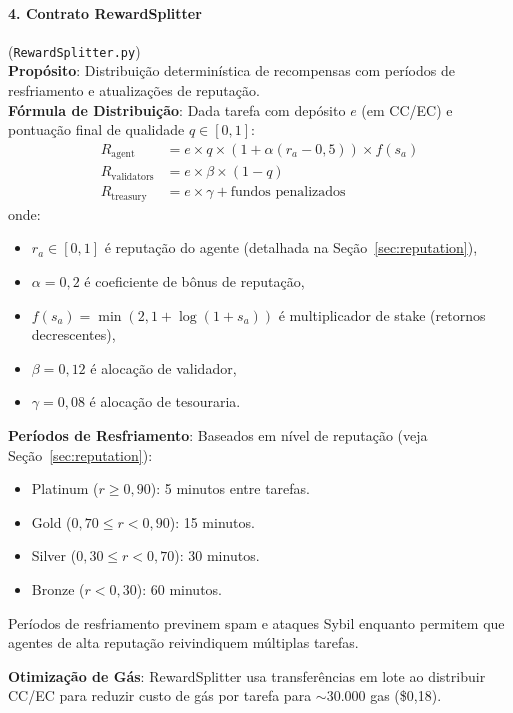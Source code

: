\documentclass[11pt]{article}
\begin{document}
\paragraph{4. Contrato RewardSplitter} (\texttt{RewardSplitter.py})\\
\textbf{Propósito}: Distribuição determinística de recompensas com períodos de resfriamento e atualizações de reputação.\\
\textbf{Fórmula de Distribuição}: Dada tarefa com depósito $e$ (em CC/EC) e pontuação final de qualidade $q \in [0,1]$:
\begin{align}
R_{\text{agent}} &= e \times q \times \left(1 + \alpha (r_a - 0,5)\right) \times f(s_a) \label{eq:reward-agent} \\
R_{\text{validators}} &= e \times \beta \times (1-q) \label{eq:reward-validators} \\
R_{\text{treasury}} &= e \times \gamma + \text{fundos penalizados} \label{eq:reward-treasury}
\end{align}
onde:
\begin{itemize}[noitemsep]
  \item $r_a \in [0,1]$ é reputação do agente (detalhada na Seção~\ref{sec:reputation}),
  \item $\alpha = 0,2$ é coeficiente de bônus de reputação,
  \item $f(s_a) = \min(2, 1 + \log(1+s_a))$ é multiplicador de stake (retornos decrescentes),
  \item $\beta = 0,12$ é alocação de validador,
  \item $\gamma = 0,08$ é alocação de tesouraria.
\end{itemize}
\textbf{Períodos de Resfriamento}: Baseados em nível de reputação (veja Seção~\ref{sec:reputation}):
\begin{itemize}[noitemsep]
  \item Platinum ($r \geq 0,90$): 5 minutos entre tarefas.
  \item Gold ($0,70 \leq r < 0,90$): 15 minutos.
  \item Silver ($0,30 \leq r < 0,70$): 30 minutos.
  \item Bronze ($r < 0,30$): 60 minutos.
\end{itemize}
Períodos de resfriamento previnem spam e ataques Sybil enquanto permitem que agentes de alta reputação reivindiquem múltiplas tarefas.

\textbf{Otimização de Gás}: RewardSplitter usa transferências em lote ao distribuir CC/EC para reduzir custo de gás por tarefa para $\sim$30.000 gas (\$0,18).
\end{document}
